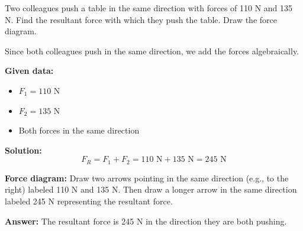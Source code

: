 \begin{exercise}
    Two colleagues push a table in the same direction with forces of 110 N and 135 N. Find the resultant force with which they push the table.
    Draw the force diagram.


    \begin{solu}
        Since both colleagues push in the same direction, we add the forces algebraically.

        \textbf{Given data:}
        \begin{itemize}
            \item $F_1 = 110$ N
            \item $F_2 = 135$ N
            \item Both forces in the same direction
        \end{itemize}

        \textbf{Solution:}
        $$F_R = F_1 + F_2 = 110\text{ N} + 135\text{ N} = 245\text{ N}$$

        \textbf{Force diagram:} Draw two arrows pointing in the same direction (e.g., to the right) labeled 110 N and 135 N. Then draw a longer arrow in the same direction labeled 245 N representing the resultant force.

        \textbf{Answer:} The resultant force is 245 N in the direction they are both pushing.
    \end{solu}
\end{exercise}


